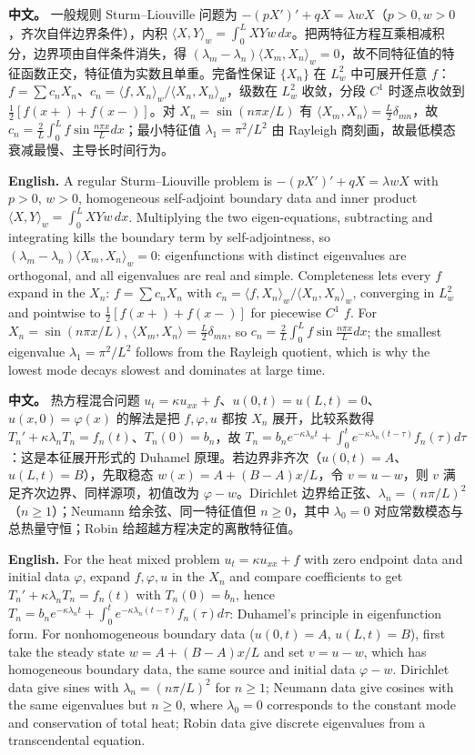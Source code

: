 \documentclass[UTF8,11pt,a4paper]{ctexart}
\newcommand{\APS}[2]{\par\noindent\textbf{中文。} #1\par\noindent\textbf{English.} #2\par\smallskip}
\begin{document}
\APS{一般规则 Sturm--Liouville 问题为 $-(pX')'+qX=\lambda wX$（$p>0,w>0$，齐次自伴边界条件），内积 $\langle X,Y\rangle_w=\int_0^LXYw\,dx$。把两特征方程互乘相减积分，边界项由自伴条件消失，得 $(\lambda_m-\lambda_n)\langle X_m,X_n\rangle_w=0$，故不同特征值的特征函数正交，特征值为实数且单重。完备性保证 $\{X_n\}$ 在 $L^2_w$ 中可展开任意 $f$：$f=\sum c_nX_n$、$c_n=\langle f,X_n\rangle_w/\langle X_n,X_n\rangle_w$，级数在 $L^2_w$ 收敛，分段 $C^1$ 时逐点收敛到 $\frac12[f(x+)+f(x-)]$。对 $X_n=\sin(n\pi x/L)$ 有 $\langle X_m,X_n\rangle=\frac L2\delta_{mn}$，故 $c_n=\frac2L\int_0^Lf\sin\frac{n\pi x}{L}dx$；最小特征值 $\lambda_1=\pi^2/L^2$ 由 Rayleigh 商刻画，故最低模态衰减最慢、主导长时间行为。}{A regular Sturm--Liouville problem is $-(pX')'+qX=\lambda wX$ with $p>0$, $w>0$, homogeneous self-adjoint boundary data and inner product $\langle X,Y\rangle_w=\int_0^LXYw\,dx$. Multiplying the two eigen-equations, subtracting and integrating kills the boundary term by self-adjointness, so $(\lambda_m-\lambda_n)\langle X_m,X_n\rangle_w=0$: eigenfunctions with distinct eigenvalues are orthogonal, and all eigenvalues are real and simple. Completeness lets every $f$ expand in the $X_n$: $f=\sum c_nX_n$ with $c_n=\langle f,X_n\rangle_w/\langle X_n,X_n\rangle_w$, converging in $L^2_w$ and pointwise to $\frac12[f(x+)+f(x-)]$ for piecewise $C^1$ $f$. For $X_n=\sin(n\pi x/L)$, $\langle X_m,X_n\rangle=\frac L2\delta_{mn}$, so $c_n=\frac2L\int_0^Lf\sin\frac{n\pi x}{L}dx$; the smallest eigenvalue $\lambda_1=\pi^2/L^2$ follows from the Rayleigh quotient, which is why the lowest mode decays slowest and dominates at large time.}
\APS{热方程混合问题 $u_t=\kappa u_{xx}+f$、$u(0,t)=u(L,t)=0$、$u(x,0)=\varphi(x)$ 的解法是把 $f,\varphi,u$ 都按 $X_n$ 展开，比较系数得 $T_n'+\kappa\lambda_nT_n=f_n(t)$、$T_n(0)=b_n$，故 $T_n=b_ne^{-\kappa\lambda_nt}+\int_0^te^{-\kappa\lambda_n(t-\tau)}f_n(\tau)d\tau$：这是本征展开形式的 Duhamel 原理。若边界非齐次（$u(0,t)=A$、$u(L,t)=B$），先取稳态 $w(x)=A+(B-A)x/L$，令 $v=u-w$，则 $v$ 满足齐次边界、同样源项，初值改为 $\varphi-w$。Dirichlet 边界给正弦、$\lambda_n=(n\pi/L)^2$（$n\ge1$）；Neumann 给余弦、同一特征值但 $n\ge0$，其中 $\lambda_0=0$ 对应常数模态与总热量守恒；Robin 给超越方程决定的离散特征值。}{For the heat mixed problem $u_t=\kappa u_{xx}+f$ with zero endpoint data and initial data $\varphi$, expand $f,\varphi,u$ in the $X_n$ and compare coefficients to get $T_n'+\kappa\lambda_nT_n=f_n(t)$ with $T_n(0)=b_n$, hence $T_n=b_ne^{-\kappa\lambda_nt}+\int_0^te^{-\kappa\lambda_n(t-\tau)}f_n(\tau)d\tau$: Duhamel's principle in eigenfunction form. For nonhomogeneous boundary data ($u(0,t)=A$, $u(L,t)=B$), first take the steady state $w=A+(B-A)x/L$ and set $v=u-w$, which has homogeneous boundary data, the same source and initial data $\varphi-w$. Dirichlet data give sines with $\lambda_n=(n\pi/L)^2$ for $n\ge1$; Neumann data give cosines with the same eigenvalues but $n\ge0$, where $\lambda_0=0$ corresponds to the constant mode and conservation of total heat; Robin data give discrete eigenvalues from a transcendental equation.}
\end{document}
